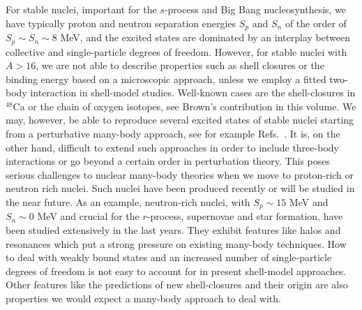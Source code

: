 \documentclass[12pt]{iopart}
\begin{document}
For stable nuclei, important for the $s$-process and Big Bang nucleosynthesis,
we have typically proton and neutron separation energies 
$S_p$ and $S_n$ of the  order of $S_p\sim S_n \sim 8$ MeV,
and the excited states are dominated by an interplay 
between collective and single-particle  degrees of freedom. 
However, for stable nuclei with $A > 16$, we are 
not able to describe properties such as shell 
closures or the binding energy based on a microscopic approach,
unless we employ a fitted two-body interaction in shell-model studies. 
Well-known cases are the shell-closures in $^{48}$Ca or 
the chain of oxygen isotopes,
see Brown's contribution in this volume.
We may, however, be able to reproduce several excited 
states of stable nuclei starting from a perturbative 
many-body approach, see for example Refs.~\cite{mhj95}. 
It is, on the other hand, difficult to extend such approaches in 
order to include three-body interactions or go 
beyond a certain order in perturbation theory. 
This poses serious challenges to nuclear many-body 
theories when we move to proton-rich
or neutron rich nuclei. Such nuclei have been produced recently 
or will be studied in the near future. As an example, neutron-rich nuclei, with 
$S_p\sim 15$ MeV and $S_n\sim 0$ MeV and crucial 
for the $r$-process, supernovae and 
star formation, have been studied extensively in 
the last years. They exhibit features 
like halos and resonances which put a strong pressure on existing   
many-body techniques. How to deal with weakly bound states and 
an increased number of single-particle degrees of 
freedom is not easy to account for in present shell-model 
approaches. Other features like the predictions of 
new shell-closures and their origin
are also properties we would expect a many-body approach to deal with. 
\end{document}
